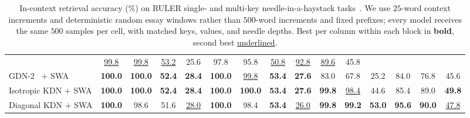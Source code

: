 \documentclass[11pt,letterpaper,logo]{yalearxiv}
\begin{document}
\begin{table}[t]
{\begin{tabular}{@{}l cccc cccc ccc ccc@{}}
  & \underline{99.8} & \underline{99.8} & \underline{53.2} & 25.6
  & 97.8 & 95.8 & \underline{50.8}
  & \underline{92.8} & \underline{89.6} & 45.8 \\
GDN-2~\citeyearpar{hatamizadeh2026gdn2} $+$ SWA
  & \textbf{100.0} & \textbf{100.0} & \textbf{52.4} & \textbf{28.4}
  & \textbf{100.0} & \underline{99.8} & \textbf{53.4} & \textbf{27.6}
  & 83.0 & 67.8 & 25.2
  & 84.0 & 76.8 & 45.6 \\
\rowcolor{blue!8}
Isotropic KDN $+$ SWA
  & \textbf{100.0} & \textbf{100.0} & \textbf{52.4} & \textbf{28.4}
  & \textbf{100.0} & \textbf{100.0} & \textbf{53.4} & \textbf{27.6}
  & \textbf{99.8} & \underline{98.4} & 44.6
  & 85.4 & 89.0 & \textbf{49.8} \\
\rowcolor{blue!8}
Diagonal KDN $+$ SWA
  & \textbf{100.0} & 98.6 & 51.6 & \underline{28.0}
  & \textbf{100.0} & 98.4 & \textbf{53.4} & \underline{26.0}
  & \textbf{99.8} & \textbf{99.2} & \textbf{53.0}
  & \textbf{95.6} & \textbf{90.0} & \underline{47.8} \\
\bottomrule
\end{tabular}%
}
\caption{In-context retrieval accuracy (\%) on RULER single- and multi-key needle-in-a-haystack
tasks~\citep{hsieh2024ruler}. We use $25$-word context increments and deterministic random essay
windows rather than $500$-word increments and fixed prefixes; every model receives the same $500$
samples per cell, with matched keys, values, and needle depths. Best per column within each block in
\textbf{bold}, second best \underline{underlined}.}
\label{tab:pretrain-niah}
\end{table}
\end{document}
